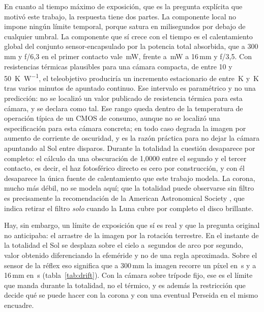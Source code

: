 \documentclass[10pt,a4paper]{article}
\begin{document}
En cuanto al tiempo máximo de exposición, que es la pregunta explícita que
motivó este trabajo, la respuesta tiene dos partes. La componente local no
impone ningún límite temporal, porque satura en milisegundos por debajo de
cualquier umbral. La componente que sí crece con el tiempo es el calentamiento
global del conjunto sensor-encapsulado por la potencia total absorbida, que a
300\,mm y f/6,3 en el primer contacto vale \PglobThreeZeroZero\,mW, frente a
\PglobOneSix\,mW a 16\,mm y f/3,5. Con resistencias térmicas plausibles para una
cámara compacta, de entre 10 y 50~\si{\kelvin\per\watt}, el teleobjetivo
produciría un incremento estacionario de entre \dTglobThreeZeroZeroLo\,K y
\dTglobThreeZeroZeroHi\,K tras varios minutos de apuntado continuo. Ese
intervalo es paramétrico y no una predicción: no se localizó un valor publicado
de resistencia térmica para esta cámara, y se declara como tal.
Ese rango queda dentro de la temperatura de operación típica de un CMOS de
consumo, aunque no se localizó una especificación para esta cámara concreta; en
todo caso degrada la imagen por aumento de corriente de oscuridad, y es la razón
práctica para no dejar la cámara apuntando al Sol entre disparos. Durante la totalidad la cuestión desaparece por completo: el cálculo da una
obscuración de 1,0000 entre el segundo y el tercer contacto, es decir, el haz
fotosférico directo es cero por construcción, y con él desaparece la única
fuente de calentamiento que este trabajo modela. La corona, mucho más débil, no
se modela aquí; que la totalidad puede observarse sin filtro es precisamente la
recomendación de la American Astronomical Society \cite{aas}, que indica
retirar el filtro \emph{solo} cuando la Luna cubre por completo el disco
brillante.

Hay, sin embargo, un límite de exposición que sí es real y que la pregunta
original no anticipaba: el arrastre de la imagen por la rotación terrestre. En
el instante de la totalidad el Sol se desplaza sobre el cielo a
\driftRate\,segundos de arco por segundo, valor obtenido diferenciando la
efeméride y no de una regla aproximada. Sobre el sensor de la réflex eso
significa que a 300\,mm la imagen recorre un píxel en \driftThreeZeroZero\,s y a
16\,mm en \driftOneSix\,s (tabla~\ref{tab:drift}). Con la cámara sobre trípode
fijo, ese es el límite que manda durante la totalidad, no el térmico, y es
además la restricción que decide qué se puede hacer con la corona y con una
eventual Perseida en el mismo encuadre.


\end{document}

